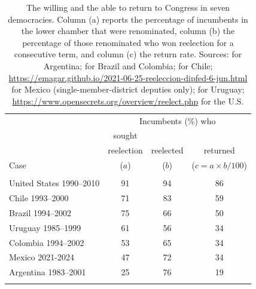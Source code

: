 \documentclass[letter,12pt]{article}
\newcommand{\mc}{\multicolumn}
\begin{document}
\begin{table}
  \centering
  \begin{tabular}{lccc}
                             & \mc{3}{c}{Incumbents (\%) who} \\ 
                             & sought      &             &            \\ [-.5ex]
                             & reelection  & reelected   & returned   \\ [-.5ex]
    Case                     &   ($a$)     &   ($b$)     & ($c=a\times b/100$) \\ \hline \\ [-1.25ex] 
    United States 1990--2010 &    91       &     94      &     86     \\ 
    Chile 1993--2000         &    71       &     83      &     59     \\
    Brazil 1994--2002        &    75       &     66      &     50     \\
    Uruguay 1985--1999       &    61       &     56      &     34     \\
    Colombia 1994--2002      &    53       &     65      &     34     \\                 
    Mexico 2021-2024         &    47       &     72      &     34     \\
    Argentina 1983--2001     &    25       &     76      &     19     \\ \\ [-1.25ex] \hline
  \end{tabular}
  \caption{The willing and the able to return to Congress in seven democracies. Column (a) reports the percentage of incumbents in the lower chamber that were renominated, column (b) the percentage of those renominated who won reelection for a consecutive term, and column (c) the return rate. Sources: \citet[][:658]{jones.etal.amateurLegis.2002} for Argentina; \citet{botero.renno-Career-reelec-br-col2007} for Brazil and Colombia; \citet{naviaIncumbency.2000} for Chile; \protect\url{https://emagar.github.io/2021-06-25-reeleccion-dipfed-6-jun.html} for Mexico (single-member-district deputies only); \citet{altman-chasquetti-Career-reelec-urug2005} for Uruguay; \protect\url{https://www.opensecrets.org/overview/reelect.php} for the U.S.}\label{T:retRate}
\end{table}
\end{document}
